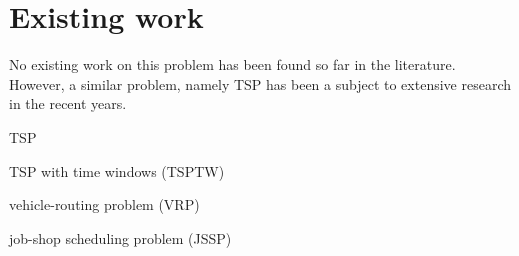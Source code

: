 \documentclass{article}
\theoremstyle{definition}
\newtheorem{theorem}{Theorem}
\begin{document}


\section{Existing work}
No existing work on this problem has been found so far in the literature. However, a similar problem, namely TSP has been a subject to extensive research in the recent years.

TSP

TSP with time windows (TSPTW)

vehicle-routing problem (VRP)

job-shop scheduling problem (JSSP)





\end{document}
